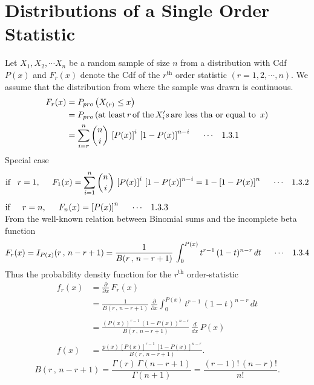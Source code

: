 \documentclass[12pt,a4paper]{report}
\theoremstyle{definition}
\theoremstyle{plain}
\begin{document}
\section{Distributions of a Single Order Statistic}
Let $X_1, X_2, \cdots X_n$ be a random sample of size $n$ from a distribution with Cdf $P(x)$ and $F_r(x)$ denote the Cdf of the $r^{\text{th}}$ order statistic $(r = 1, 2, \cdots, n)$. We assume that the distribution from where the sample was drawn is continuous.
\begin{align*}
F_r(x) & = P_{pro}\left(X_{(r)} \leq x\right)\\
& = P_{pro}\left(\text{at least}\, r\, \text{of the}\, X_i's\, \text{are less tha or equal to }\, x\right)\\
& = \sum^n_{i = r} \binom{n}{i}\, \left[P(x)\right]^i\,\left[1 - P(x)\right]^{n - i} \hspace{0.5cm}\cdots\hspace{0.3cm} 1.3.1
\end{align*}
Special case
$$\text{if}\hspace{0.3cm} r = 1, \hspace{0.5cm} F_1(x) = \sum^n_{i = 1} \binom{n}{i}\, \left[P(x)\right]^i\, \left[1 - P(x)\right]^{n - i} = 1 - \left[1 - P(x)\right]^n\hspace{0.5cm} \cdots\hspace{0.3cm} 1.3.2$$
$\text{if}\hspace{0.5cm} r  = n, \hspace{0.5cm} F_n(x) = \left[P(x)\right]^n\hspace{0.5cm}\cdots\hspace{0.3cm} 1.3.3$\\

From the well-known relation between Binomial sums and the incomplete beta function 
$$F_r(x) = I_{P(x)}(r\,,  \, n - r + 1) = \frac{1}{B(r\, , \, n - r + 1)}\, \int_0^{P(x)}t^{r - 1}\, (1 - t)^{n - r}\, dt\hspace{0.5cm}\cdots\hspace{0.3cm}1.3.4$$
Thus the probability density function for the $r^{\text{th}}$ order-statistic
\begin{align*}
f_r(x) & = \frac{\partial}{\partial x}\,F_r(x)\\
& = \frac{1}{B(r\, , \, n - r + 1)}\, \frac{\partial}{\partial x}\int^{P(x)}_0t^{r - 1}\, (1 - t)^{n - r}\, dt\\\\
& = \frac{\left(P(x)\right)^{r - 1}\, \left(1 - P(x)\right)^{n - r}}{B(r\, , \, n - r + 1)}\, \frac{d}{dx}\, P(x)\\\\
f(x) &  = \frac{p(x)\, \left[P(x)\right]^{r -1}\, \left[1 - P(x)\right]^{n - r}}{B(r\, , \, n - r + 1)}.
\end{align*}
$$B(r\, , \, n - r + 1) = \frac{\Gamma(r)\, \Gamma(n - r + 1)}{\Gamma(n + 1)}  = \frac{(r - 1)!\, (n - r)!}{n!}.$$
\end{document}
